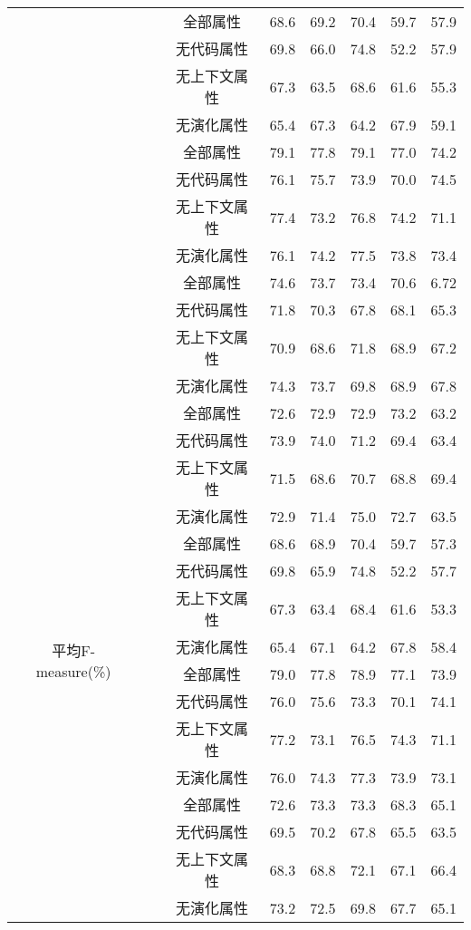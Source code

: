 \begin{table} [htbp]
\begin{tabular}{cccccccc}
\cline{2-8}
&~\multirow{4}{*}{jEdit}
&全部属性     & 68.6    & 69.2  & 70.4 & 59.7 & 57.9 \\
&&无代码属性  & 69.8    & 66.0   & 74.8 & 52.2 & 57.9 \\
&&无上下文属性  & 67.3    &63.5  & 68.6 & 61.6 & 55.3 \\
&&无演化属性& 65.4    & 67.3  & 64.2 & 67.9 & 59.1 \\
\cline{2-8}
&~\multirow{4}{*}{jFreeChart} 
&全部属性     & 79.1    & 77.8  & 79.1 & 77.0  & 74.2 \\
&&无代码属性  & 76.1    & 75.7  & 73.9 & 70.0   & 74.5 \\
&&无上下文属性  & 77.4    & 73.2  & 76.8 & 74.2 & 71.1 \\
&&无演化属性& 76.1    & 74.2  & 77.5 & 73.8 & 73.4 \\
\cline{2-8}
&~\multirow{4}{*}{Tuxguitar} 
&全部属性   & 74.6    & 73.7  & 73.4 & 70.6 & 6.72 \\
&&无代码属性  & 71.8    & 70.3  & 67.8 & 68.1 & 65.3 \\
&&无上下文属性  & 70.9    & 68.6  & 71.8 & 68.9 & 67.2 \\
&&无演化属性& 74.3    & 73.7  & 69.8 & 68.9 & 67.8 \\
\hline
\multirow{16}{*}{平均F-measure(\%)}
&~\multirow{4}{*}{ArgoUML}
&全部属性     & 72.6    & 72.9  & 72.9 & 73.2 & 63.2 \\
&&无代码属性& 73.9    & 74.0   & 71.2 & 69.4 & 63.4 \\
&&无上下文属性   & 71.5    & 68.6  & 70.7 & 68.8 & 69.4 \\
&&无演化属性& 72.9    & 71.4  & 75.0  & 72.7 & 63.5 \\
\cline{2-8}
&~\multirow{4}{*}{jEdit} 
&全部属性      & 68.6    & 68.9  & 70.4 & 59.7 & 57.3 \\
&&无代码属性 & 69.8    & 65.9  & 74.8 & 52.2 & 57.7 \\
&&无上下文属性   & 67.3    & 63.4  & 68.4 & 61.6 & 53.3 \\
&&无演化属性& 65.4    & 67.1  & 64.2 & 67.8 & 58.4 \\
\cline{2-8}
&~\multirow{4}{*}{jFreeChart} 
&全部属性      & 79.0     & 77.8  & 78.9 & 77.1 & 73.9 \\
&&无代码属性 & 76.0     & 75.6  & 73.3 & 70.1 & 74.1 \\
&&无上下文属性   & 77.2    & 73.1  & 76.5 & 74.3 & 71.1 \\
&&无演化属性& 76.0     & 74.3  & 77.3 & 73.9 & 73.1 \\
\cline{2-8}
&~\multirow{4}{*}{Tuxguitar} 
&全部属性         & 72.6    &73.3  & 73.3 & 68.3 & 65.1 \\
&&无代码属性 & 69.5    & 70.2  & 67.8 & 65.5 & 63.5 \\
&&无上下文属性   & 68.3    & 68.8  & 72.1 & 67.1 & 66.4 \\
&&无演化属性& 73.2    & 72.5  & 69.8 & 67.7 & 65.1\\
\bottomrule[1.5pt]
\end{tabular}
\end{table} 

